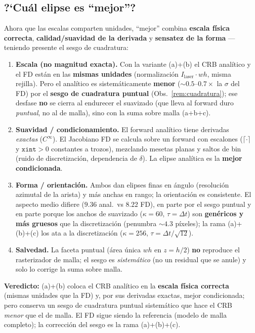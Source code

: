 \documentclass[11pt,a4paper]{article}
\theoremstyle{plain}
\theoremstyle{definition}
\begin{document}
\subsection{\textup{?`}Cu\'al elipse es ``mejor''?}
Ahora que las escalas comparten unidades, ``mejor'' combina \textbf{escala
f\'isica correcta}, \textbf{calidad/suavidad de la derivada} y \textbf{sensatez de
la forma} --- teniendo presente el sesgo de cuadratura:
\begin{enumerate}[nosep]
    \item \textbf{Escala (no magnitud exacta).} Con la variante (a)+(b) el CRB
    anal\'itico y el FD est\'an en las \textbf{mismas unidades} (normalizaci\'on
    $I_{\mathrm{laser}}\!\cdot\!w h$, misma rejilla). Pero el anal\'itico es
    sistem\'aticamente \textbf{menor} ($\sim0.5$--$0.7\times$ la $\sigma$ del FD)
    por el \textbf{sesgo de cuadratura puntual} (Obs.~\ref{rem:cuadratura}); ese
    desfase \textbf{no} se cierra al endurecer el suavizado (que lleva al forward
    duro \emph{puntual}, no al de malla), sino con la suma sobre malla (a+b+c).
    \item \textbf{Suavidad / condicionamiento.} El forward anal\'itico tiene
    derivadas \emph{exactas} ($C^\infty$). El Jacobiano FD se calcula sobre un
    forward con escalones ($\lceil\cdot\rceil$ y $\texttt{xint}>0$ constantes a
    trozos), mezclando mesetas planas y saltos de bin (ruido de discretizaci\'on,
    dependencia de $\delta$). La elipse anal\'itica es la \textbf{mejor
    condicionada}.
    \item \textbf{Forma / orientaci\'on.} Ambos dan elipses finas en \'angulo
    (resoluci\'on azimutal de la arista) y m\'as anchas en rango; la orientaci\'on
    es consistente. El aspecto medio difiere ($9.36$ anal.\ vs $8.22$ FD), en
    parte por el sesgo puntual y en parte porque los anchos de suavizado
    ($\kappa=60$, $\tau=\Delta t$) son \textbf{gen\'ericos y m\'as gruesos} que la
    discretizaci\'on (penumbra $\sim4.3$ p\'ixeles); la rama (a)+(b)+(c) los ata a
    la discretizaci\'on ($\kappa=256$, $\tau=\Delta t/\sqrt{12}$).
    \item \textbf{Salvedad.} La faceta puntual (\'area \'unica $w h$ en $z=h/2$)
    \textbf{no} reproduce el rasterizador de malla; el sesgo es \emph{sistem\'atico}
    (no un residual que se anule) y solo lo corrige la suma sobre malla.
\end{enumerate}
\textbf{Veredicto:} (a)+(b) coloca el CRB anal\'itico en la \textbf{escala f\'isica
correcta} (mismas unidades que la FD) y, por sus derivadas exactas, mejor
condicionada; pero conserva un sesgo de cuadratura puntual sistem\'atico que hace
el CRB \emph{menor} que el de malla. El FD sigue siendo la referencia (modelo de
malla completo); la correcci\'on del sesgo es la rama (a)+(b)+(c).
\end{document}
